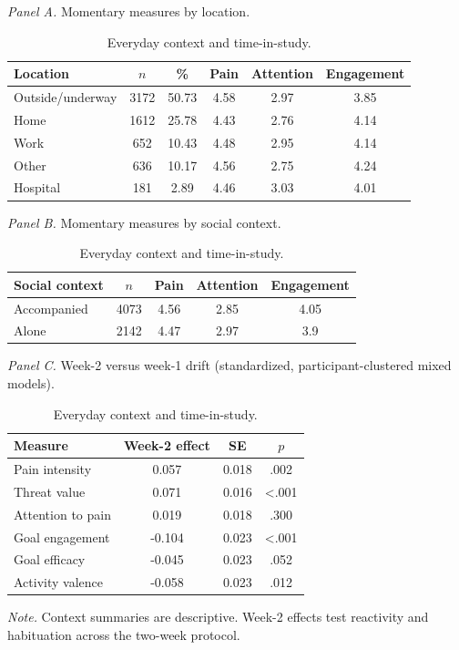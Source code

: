 \begin{table}[H]
\raggedright
\caption{Everyday context and time-in-study.}
\label{tab:sup-context}
\footnotesize
\begingroup
\setlength{\tabcolsep}{4pt}
\renewcommand{\arraystretch}{1.08}
\noindent\textit{Panel A.} Momentary measures by location.\par\vspace{2pt}
\begin{tabular*}{\textwidth}{@{\extracolsep{\fill}}lccccc@{}}
\toprule
Location & $n$ & \% & Pain & Attention & Engagement \\
\midrule
Outside/underway & 3172 & 50.73 & 4.58 & 2.97 & 3.85 \\
Home & 1612 & 25.78 & 4.43 & 2.76 & 4.14 \\
Work & 652 & 10.43 & 4.48 & 2.95 & 4.14 \\
Other & 636 & 10.17 & 4.56 & 2.75 & 4.24 \\
Hospital & 181 & 2.89 & 4.46 & 3.03 & 4.01 \\
\bottomrule
\end{tabular*}
\par\vspace{6pt}\noindent\textit{Panel B.} Momentary measures by social context.\par\vspace{2pt}
\begin{tabular*}{\textwidth}{@{\extracolsep{\fill}}lcccc@{}}
\toprule
Social context & $n$ & Pain & Attention & Engagement \\
\midrule
Accompanied & 4073 & 4.56 & 2.85 & 4.05 \\
Alone & 2142 & 4.47 & 2.97 & 3.9 \\
\bottomrule
\end{tabular*}
\par\vspace{6pt}\noindent\textit{Panel C.} Week-2 versus week-1 drift (standardized, participant-clustered mixed models).\par\vspace{2pt}
\begin{tabular*}{\textwidth}{@{\extracolsep{\fill}}lccc@{}}
\toprule
Measure & Week-2 effect & SE & $p$ \\
\midrule
Pain intensity & 0.057 & 0.018 & .002 \\
Threat value & 0.071 & 0.016 & <.001 \\
Attention to pain & 0.019 & 0.018 & .300 \\
Goal engagement & -0.104 & 0.023 & <.001 \\
Goal efficacy & -0.045 & 0.023 & .052 \\
Activity valence & -0.058 & 0.023 & .012 \\
\bottomrule
\end{tabular*}
\par\vspace{3pt}\noindent\parbox{\textwidth}{\footnotesize\textit{Note.} Context summaries are descriptive. Week-2 effects test reactivity and habituation across the two-week protocol.}
\endgroup
\end{table}
